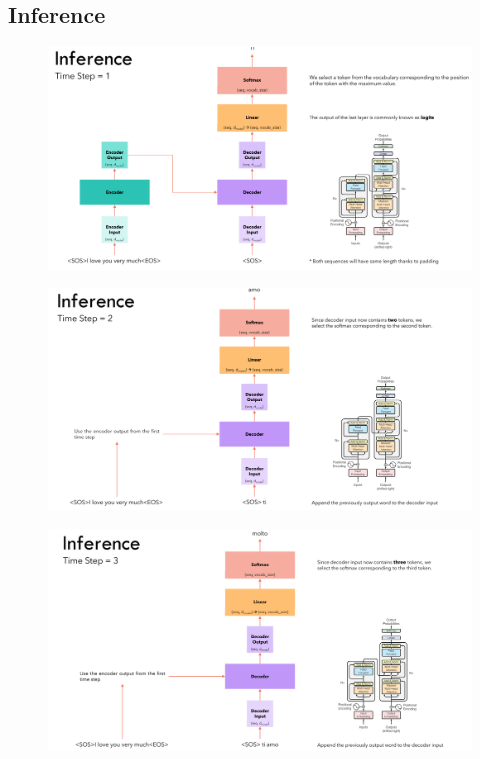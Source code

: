 \documentclass{book}
\begin{document}
        \subsection{Inference}
        \begin{figure}[H]
            \centering
            \includegraphics[width=1.0  \linewidth]{images/12d_19.png}
    
        \end{figure}
        \begin{figure}[H]
            \centering
            \includegraphics[width=1.0  \linewidth]{images/12d_20.png}
    
        \end{figure}
        \begin{figure}[H]
            \centering
            \includegraphics[width=1.0  \linewidth]{images/12d_21.png}
    
        \end{figure}
\end{document}
